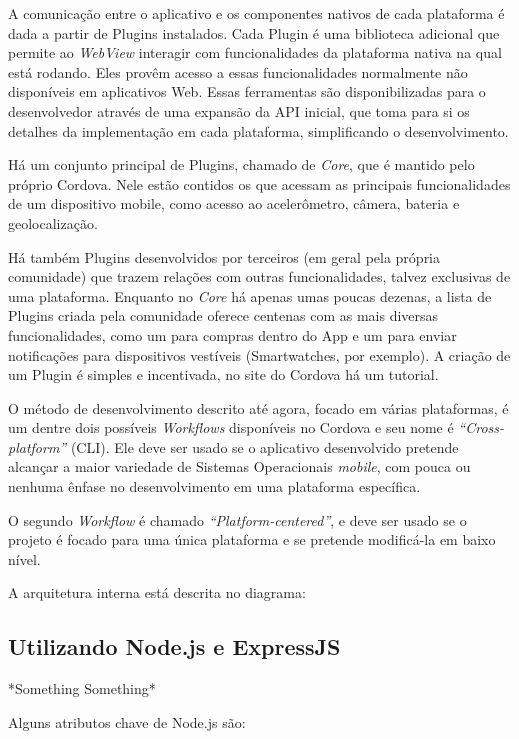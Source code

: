 \documentclass[a4paper,12pt]{article}
\begin{document}
A comunicação entre o aplicativo e os componentes nativos de cada plataforma é dada a partir de Plugins instalados. Cada Plugin é uma biblioteca adicional que permite ao \emph{WebView} interagir com funcionalidades da plataforma nativa na qual está rodando. Eles provêm acesso a essas funcionalidades normalmente não disponíveis em aplicativos Web. Essas ferramentas são disponibilizadas para o desenvolvedor através de uma expansão da API inicial, que toma para si os detalhes da implementação em cada plataforma, simplificando o desenvolvimento.

Há um conjunto principal de Plugins, chamado de \emph{Core}, que é mantido pelo próprio Cordova. Nele estão contidos os que acessam as principais funcionalidades de um dispositivo mobile, como acesso ao acelerômetro, câmera, bateria e geolocalização.

Há também Plugins desenvolvidos por terceiros (em geral pela própria comunidade) que trazem relações com outras funcionalidades, talvez exclusivas de uma plataforma. Enquanto no \emph{Core} há apenas umas poucas dezenas, a lista de Plugins criada pela comunidade oferece centenas com as mais diversas funcionalidades, como um para compras dentro do App e um para enviar notificações para dispositivos vestíveis (Smartwatches, por exemplo). A criação de um Plugin é simples e incentivada, no site do Cordova há um tutorial.

O método de desenvolvimento descrito até agora, focado em várias plataformas, é um dentre dois possíveis \emph{Workflows} disponíveis no Cordova e seu nome é \emph{“Cross-platform”} (CLI). Ele deve ser usado se o aplicativo desenvolvido pretende alcançar a maior variedade de Sistemas Operacionais \emph{mobile}, com pouca ou nenhuma ênfase no desenvolvimento em uma plataforma específica.

O segundo \emph{Workflow} é chamado \emph{“Platform-centered”}, e deve ser usado se o projeto é focado para uma única plataforma e se pretende modificá-la em baixo nível.

A arquitetura interna está descrita no diagrama:





\subsection{Utilizando Node.js e ExpressJS}

*Something Something*

Alguns atributos chave de Node.js são:
\end{document}
